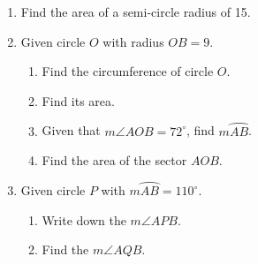 \documentclass[12pt, twoside]{article}
\begin{document}
\begin{enumerate}
\newpage
\item Find the area of a semi-circle radius of 15. \vspace{2cm}

\item Given circle $O$ with radius $OB=9$.
  \begin{multicols}{2}
   \raggedcolumns
   \begin{enumerate}
     \item Find the circumference of circle $O$. \vspace{1.7cm}
     \item Find its area.  \vspace{2cm}
     \item Given that $m\angle AOB=72^\circ$, find $m \wideparen{AB}$. \vspace{1cm}%
     \item Find the area of the sector $AOB$. \vspace{1.5cm}
   \end{enumerate}
  \end{multicols}  \vspace{3cm}

\item Given circle $P$ with $m \wideparen{AB}=110^\circ$.
  \begin{multicols}{2}
   \raggedcolumns
   \begin{enumerate}
     \item Write down the $m\angle APB$. \vspace{1.7cm}
     \item Find the $m\angle AQB$. \vspace{2cm}
   \end{enumerate}
  \end{multicols}
\newpage


\end{enumerate}
\end{document}
